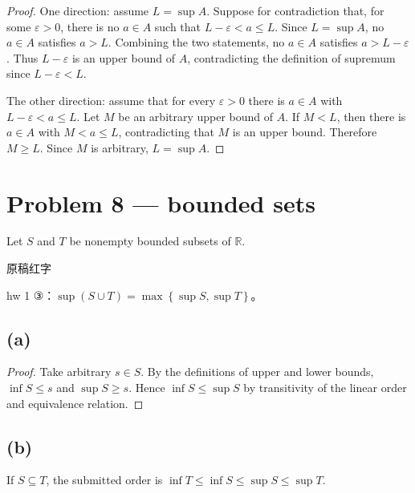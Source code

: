 \begin{proof}

One direction: assume \(L = \sup A\). Suppose for contradiction that, for some \(\varepsilon > 0\), there is no \(a \in A\) such that \(L - \varepsilon < a \leq L\). Since \(L = \sup A\), no \(a \in A\) satisfies \(a > L\). Combining the two statements, no \(a \in A\) satisfies \(a > L - \varepsilon\). Thus \(L - \varepsilon\) is an upper bound of \(A\), contradicting the definition of supremum since \(L - \varepsilon < L\).

The other direction: assume that for every \(\varepsilon > 0\) there is \(a \in A\) with \(L - \varepsilon < a \leq L\). Let \(M\) be an arbitrary upper bound of \(A\). If \(M < L\), then there is \(a \in A\) with \(M < a \leq L\), contradicting that \(M\) is an upper bound. Therefore \(M \geq L\). Since \(M\) is arbitrary, \(L = \sup A\).

\end{proof}

\section{Problem 8 --- bounded sets}

Let \(S\) and \(T\) be nonempty bounded subsets of \(\mathbb{R}\).

\begin{qlnote}{原稿红字}

hw 1 ③：\(\sup\left( {S \cup T} \right) = \max\left\{ {\sup S,\sup T} \right\}\)。

\end{qlnote}

\subsection{(a)}

\begin{proof}

Take arbitrary \(s \in S\). By the definitions of upper and lower bounds, \(\inf S \leq s\) and \(\sup S \geq s\). Hence \(\inf S \leq \sup S\) by transitivity of the linear order and equivalence relation.

\end{proof}

\subsection{(b)}

If \(S \subseteq T\), the submitted order is \(\inf T \leq \inf S \leq \sup S \leq \sup T\).


